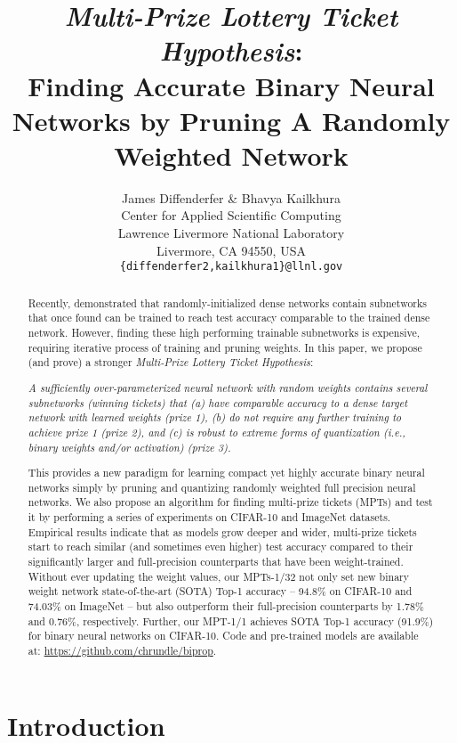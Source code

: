 \documentclass{article} \usepackage{iclr2021_conference,times}
\title{\emph{Multi-Prize Lottery Ticket Hypothesis}: \\Finding Accurate Binary Neural Networks by Pruning A Randomly Weighted Network}
\author{James Diffenderfer \& Bhavya Kailkhura\\
Center for Applied Scientific Computing\\
Lawrence Livermore National Laboratory\\
Livermore, CA 94550, USA \\
\texttt{\{diffenderfer2,kailkhura1\}@llnl.gov}
}
\begin{document}
\maketitle

\begin{abstract}
Recently, \cite{frankle2018lottery} demonstrated that randomly-initialized dense networks contain subnetworks that once found can be trained to reach test accuracy comparable to the trained dense network. However, finding these high performing trainable subnetworks is expensive, requiring iterative process of training and pruning weights. 
In this paper, we propose (and prove) a stronger \emph{Multi-Prize Lottery Ticket Hypothesis}:

\emph{A sufficiently over-parameterized neural network with random weights contains several subnetworks (winning tickets) that (a) have comparable accuracy to a dense target network with learned weights (prize 1), (b) do not require any further training to achieve prize 1 (prize 2), and (c) is robust to extreme forms of quantization (i.e., binary weights and/or activation) (prize 3).}

\noindent This provides a new paradigm for learning compact yet highly accurate binary neural networks simply by pruning and quantizing randomly weighted full precision neural networks.
We also propose an algorithm for finding multi-prize tickets (MPTs) and test it by performing a series of experiments on CIFAR-10 and ImageNet datasets. Empirical results indicate that as models grow deeper and wider, multi-prize tickets start to reach similar (and sometimes even higher) test accuracy compared to their significantly larger and full-precision counterparts that have been weight-trained.
Without ever updating the weight values, our MPTs-1/32 not only set new binary weight network state-of-the-art (SOTA) Top-1 accuracy -- 94.8\% on CIFAR-10 and 74.03\% on ImageNet -- but also outperform their full-precision counterparts by 1.78\% and 0.76\%, respectively.
Further, our MPT-1/1 achieves SOTA Top-1 accuracy (91.9\%) for binary neural networks on CIFAR-10.
Code and pre-trained models are available at: \url{https://github.com/chrundle/biprop}.
\end{abstract}


\section{Introduction}
\end{document}

